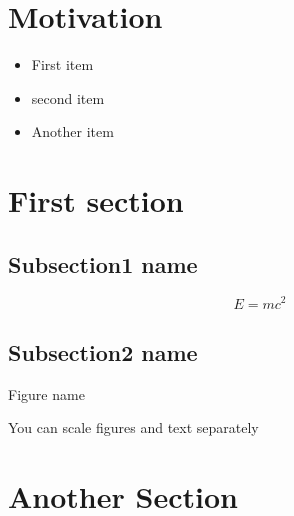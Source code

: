 \documentclass[final]{beamer}
\author{Author One$^1$ and Author Two$^2$}
\institute{$^1$ Institution1, $^2$ Institution2}
\begin{document}
\begin{poster}
\newcolumn

\section{Motivation} \justifying
\begin{itemize}
    \item First item
    \item second item
    \item Another item
\end{itemize}

\lipsum[2]

\section{First section}  \justifying
\lipsum[4]
 
\subsection{Subsection1 name}


$$
E = mc^2
$$

\subsection{Subsection2 name}
{\centering

\caption{Figure name}
\vspace{1ex}

\vspace{2ex}
\caption{You can scale figures and text separately}

}
\vspace{1ex}
\lipsum[6]
\newcolumn

\section{Another Section} \justifying
\lipsum[3]

\vspace{2ex}
\newcommand{\figwidth}{0.6\columnwidth}


\end{poster}
\end{document}
